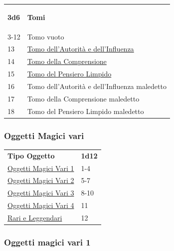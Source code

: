 \begin{multicols}{2}
{{\small\begin{tabularx}{0.45\textwidth}{lX}\hypertarget{Tomi}{}
\textbf{3d6} & \textbf{Tomi}\\
3-12 & Tomo vuoto\\
13 & \hyperlink{Tomodell'Autoritàedell'Influenza}{Tomo dell'Autorità e dell'Influenza}\\
14 & \hyperlink{TomodellaComprensione}{Tomo della Comprensione}\\
15 & \hyperlink{TomodelPensieroLimpido}{Tomo del Pensiero Limpido}\\
16 & Tomo dell'Autorità e dell'Influenza maledetto\\
17 & Tomo della Comprensione maledetto\\
18 & Tomo del Pensiero Limpido maledetto
\end{tabularx}}

\subsubsection{Oggetti Magici vari}\hypertarget{oggettimagicivari}{}\label{oggettimagicivari}

{\small\begin{tabular}{ll}
\textbf{Tipo Oggetto} & \textbf{1d12}\\
\hyperlink{Oggetti Magici Vari 1}{Oggetti Magici Vari 1}&1-4\\
\hyperlink{Oggetti Magici Vari 2}{Oggetti Magici Vari 2}&5-7\\
\hyperlink{Oggetti Magici Vari 3}{Oggetti Magici Vari 3}&8-10\\
\hyperlink{Oggetti Magici Vari 4}{Oggetti Magici Vari 4}&11\\
\hyperlink{Rari e Leggendari}{Rari e Leggendari}&12
\end{tabular}}

\subsubsection{Oggetti magici vari 1}\hypertarget{Oggetti Magici Vari 1}{}

}
\end{multicols}

